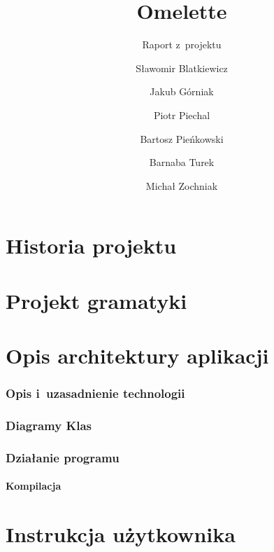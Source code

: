 \documentclass[a4paper]{scrartcl}
\let\stdpart\part
\renewcommand\part{\newpage\stdpart}
\begin{document}
\sloppy

\title{Omelette}
\subtitle{Raport z~projektu}
\author{
  Sławomir Blatkiewicz\and
  Jakub Górniak       \and
  Piotr Piechal       \and
  Bartosz Pieńkowski  \and
  Barnaba Turek       \and
  Michał Zochniak
}

\maketitle
\thispagestyle{empty}

\part{Historia projektu}





\part{Projekt gramatyki}


\part{Opis architektury aplikacji}
\section{Opis i~uzasadnienie technologii}

\section{Diagramy Klas}

\section{Działanie programu}
\subsection{Kompilacja}


\part{Instrukcja użytkownika}


\end{document}
